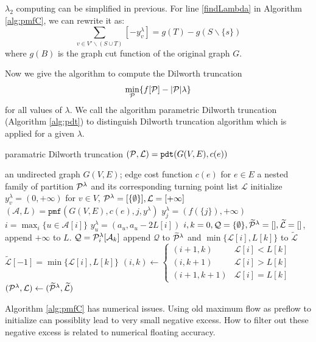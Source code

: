 \documentclass{article}
\begin{document}
$\lambda_2$ computing can be simplified in previous. For line \ref{findLambda} in  Algorithm \ref{alg:pmfC},  we can rewrite it as:
\begin{equation*}
\sum_{v\in V'\backslash (S\cup T)} [-y^{\lambda}_v ] = g(T)-g(S\backslash\{s\})
\end{equation*}
where $g(B)$ is the graph cut function of the original graph $G$.

Now we give the algorithm to compute the Dilworth truncation $$\min_{\P}\{f[\P] - \abs{\P} \lambda \}$$for all values of $\lambda$. We call the algorithm parametric Dilworth truncation (Algorithm \ref{alg:pdt}) to distinguish Dilworth truncation algorithm which is applied for a given $\lambda$.
\begin{algorithm}
\caption{paramatric Dilworth truncation $(\P, \mathcal{L})=\texttt{pdt}(G(V,E), c(e))$}\label{alg:pdt}
\begin{algorithmic}[1]
\REQUIRE an undirected graph $G(V, E)$; edge cost function $c(e)$ for $e\in E$
\ENSURE a nested family of partition $\P^{\lambda}$ and its corresponding turning point list $\mathcal{L}$
\STATE initialize $y^{\lambda}_v = (0, +\infty)$ for $ v \in V$, $\P^{\lambda} = [\{\emptyset\}], \mathcal{L} = [+\infty]$
\STATE  $(\mathcal{A}, L) = \texttt{pmf}(G(V,E), c(e), j, y^{\lambda})$
\STATE $y^{\lambda}_j = (f(\{j\}), +\infty)$
\ELSE
\STATE $ i = \max_i \{ u \in \mathcal{A}[i]\}$
\STATE $y_u^{\lambda} = (a_u, a_u - 2 L[i])$
\ENDIF
\ENDIF
\ENDFOR
\STATE $i, k = 0, \mathcal{Q} = \{\emptyset\}, \widetilde{\mathcal{\P}}^{\lambda} = [], \widetilde{\mathcal{L}} = []$, append $+\infty$ to $L$.
\STATE $\mathcal{Q} = \P^{\lambda}_i[\mathcal{A}_k]$
\STATE append $\mathcal{Q}$ to $\widetilde{\mathcal{\P}}^{\lambda}$ and $\min\{\mathcal{L}[i], L[k]\}$
to $\widetilde{\mathcal{L}}$
\ELSE
\STATE $\widetilde{\mathcal{L}}[-1] = \min\{\mathcal{L}[i], L[k]\}$
\ENDIF
\STATE $(i, k) \leftarrow \begin{cases} (i+1, k) & \mathcal{L}[i] < L[k] \\  (i, k+1) & \mathcal{L}[i] > L[k]\\ (i+1, k+1) & \mathcal{L}[i] = L[k]\end{cases}$
\ENDWHILE
\STATE $(\P^{\lambda}, \mathcal{L}) \leftarrow (\widetilde{\mathcal{\P}}^{\lambda},  \widetilde{\mathcal{L}})$
\ENDFOR
\end{algorithmic}
\end{algorithm}
Algorithm \ref{alg:pmfC} has numerical issues. Using old maximum flow as preflow to initialize can possiblity lead to very small negative excess. How to filter out these negative excess is related to numerical floating accuracy.
\end{document}
